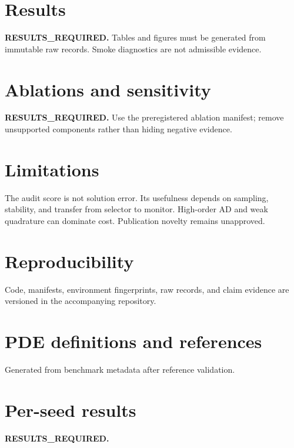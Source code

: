 \documentclass[review,12pt]{elsarticle}
\begin{document}
\section{Results}
\textbf{RESULTS\_REQUIRED.} Tables and figures must be generated from immutable
raw records. Smoke diagnostics are not admissible evidence.

\section{Ablations and sensitivity}
\textbf{RESULTS\_REQUIRED.} Use the preregistered ablation manifest; remove
unsupported components rather than hiding negative evidence.

\section{Limitations}
The audit score is not solution error. Its usefulness depends on sampling,
stability, and transfer from selector to monitor. High-order AD and weak
quadrature can dominate cost. Publication novelty remains unapproved.

\section{Reproducibility}
Code, manifests, environment fingerprints, raw records, and claim evidence are
versioned in the accompanying repository.

\appendix
\section{PDE definitions and references}
Generated from benchmark metadata after reference validation.
\section{Per-seed results}
\textbf{RESULTS\_REQUIRED.}
\end{document}
